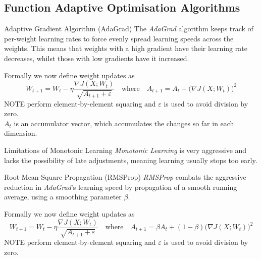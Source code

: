 \documentclass[11pt,a4paper]{article}
\begin{document}
\subsection{Function Adaptive Optimisation Algorithms}

\begin{definition}{Adaptive Gradient Algorithm (AdaGrad)}
  The \textit{AdaGrad} algorithm keeps track of per-weight learning rates to force evenly spread learning speeds across the weights. This means that weights with a high gradient have their learning rate decreases, whilst those with low gradients have it increased.
  \par Formally we now define weight updates as
  \[
    W_{t+1}=W_t-\eta\dfrac{\nabla J(X;W_t)}{\sqrt{A_{t+1}+\varepsilon}}\quad\text{where}\quad A_{t+1}=A_t+\big(\nabla J(X;W_t)\big)^2
  \]
  NOTE perform element-by-element squaring and $\varepsilon$ is used to avoid division by zero.\\
  $A_t$ is an accumulator vector, which accumulates the changes so far in each dimension.
\end{definition}

\begin{remark}{Limitations of Monotonic Learning}
  \textit{Monotonic Learning} is very aggressive and lacks the possibility of late adjustments, meaning learning usually stops too early.
\end{remark}

\begin{proposition}{Root-Mean-Square Propagation (RMSProp)}
  \textit{RMSProp} combats the aggressive reduction in \textit{AdaGrad}'s learning speed by propagation of a smooth running average, using a smoothing parameter $\beta$.
  \par Formally we now define weight updates as
  \[
    W_{t+1}=W_t-\eta\dfrac{\nabla J(X;W_t)}{\sqrt{A_{t+1}+\varepsilon}}\quad\text{where}\quad A_{t+1}=\beta A_t+(1-\beta)\big(\nabla J(X;W_t)\big)^2
  \]
  NOTE perform element-by-element squaring and $\varepsilon$ is used to avoid division by zero.\\
\end{proposition}
\end{document}
